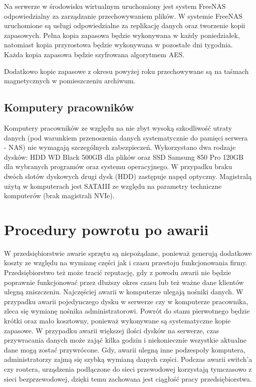 Na serwerze w środowisku wirtualnym uruchomiony jest system FreeNAS odpowiedzialny za zarządzanie przechowywaniem plików. W systemie FreeNAS uruchomione są usługi odpowiedzialne za replikację danych oraz tworzenie kopii zapasowych. Pełna kopia zapasowa będzie wykonywana w każdy poniedziałek, natomiast kopia przyrostowa będzie wykonywana w pozostałe dni tygodnia. Każda kopia zapasowa będzie szyfrowana algorytmem AES.

Dodatkowo kopie zapasowe z okresu powyżej roku przechowywane są na taśmach magnetycznych w pomieszczeniu archiwum.

\subsection{Komputery pracowników}
Komputery pracowników ze względu na nie zbyt wysoką szkodliwość utraty danych (pod warunkiem przenoszenia danych systematycznie do pamięci serwera - NAS) nie wymagają szczególnych zabezpieczeń. Wykorzystano dwa rodzaje dysków: HDD WD Black 500GB dla plików oraz SSD Samsung 850 Pro 120GB dla wybranych programów oraz systemu operacyjnego. W przypadku braku dwóch slotów dyskowych drugi dysk (HDD) zastępuje napęd optyczny. Magistralą użytą w komputerach jest SATAIII ze względu na parametry techniczne komputerów (brak magistrali NVIe).

\section{Procedury powrotu po awarii}
W przedsiębiorstwie awarie sprzętu są niepożądane, ponieważ generują dodatkowe koszty ze względu na wymianę części jak i czasu przestoju funkcjonowania firmy. Przedsiębiorstwo też może tracić reputację, gdy z powodu awarii nie będzie poprawnie funkcjonować przez dłuższy okres czasu lub też ważne dane klientów ulegną zniszczeniu. Najczęściej awarii w komputerze ulegają nośniki danych. W przypadku awarii pojedynczego dysku w serwerze czy w komputerze pracownika, zleca się wymianę nośnika administratorowi. Powrót do stanu pierwotnego będzie krótki oraz mało kosztowny, ponieważ wykonywane są systematyczne kopie zapasowe. W przypadku awarii większej ilości dysków na serwerze, czas przywracania danych może zająć kilka godzin i niekoniecznie wszystkie aktualne dane mogą zostać przywrócone.
Gdy, awarii ulegną inne podzespoły komputera, administratorzy zajmą się szybką wymianą danych części.
Podczas awarii switch'a czy routera, urządzenia podłączone do sieci przewodowej korzystają tymczasowo z sieci bezprzewodowej, dzięki temu zachowana jest ciągłość pracy przedsiębiorstwa.

